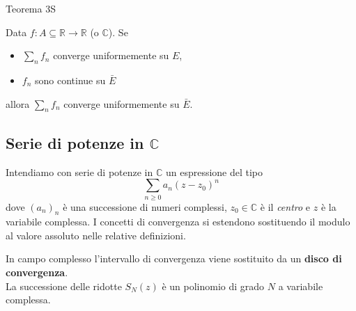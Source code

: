 \documentclass[x11names]{article}
\newcommand{\teorema}[2]{
	\begin{center}
		\fboxsep11pt
		\colorbox{myred}{\begin{minipage}{5.75in}
				\begin{redes}{#1}
					#2
				\end{redes}
		\end{minipage}}
	\end{center}
}
\begin{document}
\teorema{Teorema 3S}{
	Data \(f:A\subseteq \mathbb{R} \to \mathbb{R}\) (o \(\mathbb{C}\)). Se
	\begin{itemize}
		\item \(\sum_n f_{n}\) converge uniformemente su \(E\),
		\item \(f_{n}\) sono continue su \(\bar{E}\)
	\end{itemize}
	allora \(\sum_n f_{n}\) converge uniformemente su \(\bar{E}\).
}

\subsection{Serie di potenze in \(\mathbb{C}\)}
Intendiamo con serie di potenze in \(\mathbb{C}\) un espressione del tipo
\[ 
\sum_{n\geq 0}a_{n}(z-z_{0})^n
\]
dove \((a_{n})_{n}\) è una successione di numeri complessi, \(z_{0} \in \mathbb{C}\) è il \textit{centro} e \(z\) è la variabile complessa. I concetti di convergenza si estendono sostituendo il modulo al valore assoluto nelle relative definizioni.

In campo complesso l'intervallo di convergenza viene sostituito da un \textbf{disco di convergenza}. \\

\noindent
La successione delle ridotte \(S_{N}(z)\) è un polinomio di grado \(N\) a variabile complessa.
\end{document}
